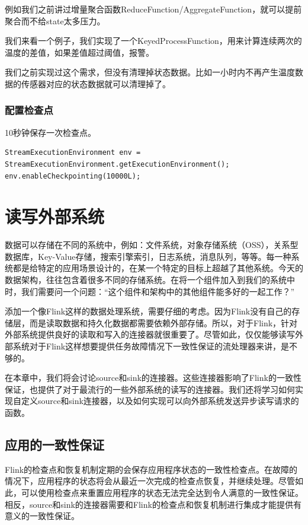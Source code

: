 \documentclass[cn,11pt,chinese]{elegantbook}
\begin{document}
例如我们之前讲过增量聚合函数ReduceFunction/AggregateFunction，就可以提前聚合而不给state太多压力。

我们来看一个例子，我们实现了一个KeyedProcessFunction，用来计算连续两次的温度的差值，如果差值超过阈值，报警。

我们之前实现过这个需求，但没有清理掉状态数据。比如一小时内不再产生温度数据的传感器对应的状态数据就可以清理掉了。

\subsection{配置检查点}

10秒钟保存一次检查点。

\begin{verbatim}
StreamExecutionEnvironment env = StreamExecutionEnvironment.getExecutionEnvironment();
env.enableCheckpointing(10000L);
\end{verbatim}

\chapter{读写外部系统}

数据可以存储在不同的系统中，例如：文件系统，对象存储系统（OSS），关系型数据库，Key-Value存储，搜索引擎索引，日志系统，消息队列，等等。每一种系统都是给特定的应用场景设计的，在某一个特定的目标上超越了其他系统。今天的数据架构，往往包含着很多不同的存储系统。在将一个组件加入到我们的系统中时，我们需要问一个问题：“这个组件和架构中的其他组件能多好的一起工作？”

添加一个像Flink这样的数据处理系统，需要仔细的考虑。因为Flink没有自己的存储层，而是读取数据和持久化数据都需要依赖外部存储。所以，对于Flink，针对外部系统提供良好的读取和写入的连接器就很重要了。尽管如此，仅仅能够读写外部系统对于Flink这样想要提供任务故障情况下一致性保证的流处理器来讲，是不够的。

在本章中，我们将会讨论source和sink的连接器。这些连接器影响了Flink的一致性保证，也提供了对于最流行的一些外部系统的读写的连接器。我们还将学习如何实现自定义source和sink连接器，以及如何实现可以向外部系统发送异步读写请求的函数。

\section{应用的一致性保证}

Flink的检查点和恢复机制定期的会保存应用程序状态的一致性检查点。在故障的情况下，应用程序的状态将会从最近一次完成的检查点恢复，并继续处理。尽管如此，可以使用检查点来重置应用程序的状态无法完全达到令人满意的一致性保证。相反，source和sink的连接器需要和Flink的检查点和恢复机制进行集成才能提供有意义的一致性保证。
\end{document}
